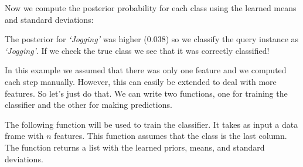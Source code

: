 \documentclass[
  11pt,
]{krantz}
\newenvironment{Shaded}{\begin{snugshade}}{\end{snugshade}}
\newcommand{\CommentTok}[1]{\textcolor[rgb]{0.37,0.37,0.37}{\textit{#1}}}
\newcommand{\FunctionTok}[1]{\textcolor[rgb]{0,0,0}{#1}}
\newcommand{\NormalTok}[1]{#1}
\newcommand{\SpecialCharTok}[1]{\textcolor[rgb]{0,0,0}{#1}}
\newcommand{\StringTok}[1]{\textcolor[rgb]{0.5,0.5,0.5}{#1}}
\begin{document}
Now we compute the posterior probability for each class using the learned means and standard deviations:

\begin{Shaded}
\end{Shaded}

The posterior for \emph{`Jogging'} was higher (\(0.038\)) so we classify the query instance as \emph{`Jogging'}. If we check the true class we see that it was correctly classified!

\begin{Shaded}
\end{Shaded}

In this example we assumed that there was only one feature and we computed each step manually. However, this can easily be extended to deal with more features. So let's just do that. We can write two functions, one for training the classifier and the other for making predictions.

The following function will be used to train the classifier. It takes as input a data frame with \(n\) features. This function assumes that the class is the last column. The function returns a list with the learned priors, means, and standard deviations.
\end{document}
